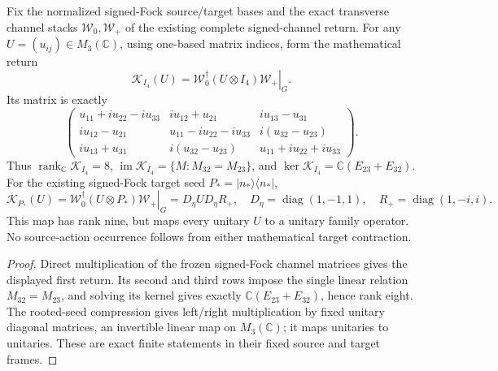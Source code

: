 \documentclass[11pt]{article}
\begin{document}
\begin{proposition}
\label{p1:prop:signed-target-image-rank}
Fix the normalized signed-Fock source/target bases and the exact
transverse channel stacks $\mathcal W_0,\mathcal W_+$ of the existing
complete signed-channel return.  For any $U=(u_{ij})\in M_3(\mathbb C)$, using one-based matrix indices,
form the mathematical return
\[
\mathcal K_{I_4}(U)
 =\left.\mathcal W_0^\dagger(U\otimes I_4)\mathcal W_+\right|_G.
\]
Its matrix is exactly
\[
\begin{pmatrix}
 u_{11}+iu_{22}-iu_{33} & iu_{12}+u_{21} & iu_{13}-u_{31}\\
 iu_{12}-u_{21} & u_{11}-iu_{22}-iu_{33} & i(u_{32}-u_{23})\\
 iu_{13}+u_{31} & i(u_{32}-u_{23}) & u_{11}+iu_{22}+iu_{33}
\end{pmatrix}.
\]
Thus $\operatorname{rank}_{\mathbb C}\mathcal K_{I_4}=8$,
$\operatorname{im}\mathcal K_{I_4}=\{M:M_{32}=M_{23}\}$,
and $\ker\mathcal K_{I_4}=\mathbb C(E_{23}+E_{32})$.
For the existing signed-Fock target seed $P_*=|n_*\rangle\langle n_*|$,
\[
\mathcal K_{P_*}(U)
 =\left.\mathcal W_0^\dagger(U\otimes P_*)\mathcal W_+\right|_G
 = D_\eta U D_\eta R_+,
\quad D_\eta=\operatorname{diag}(1,-1,1),\quad
 R_+=\operatorname{diag}(1,-i,i).
\]
This map has rank nine, but maps every unitary $U$ to a unitary
family operator. No source-action occurrence follows from either
mathematical target contraction.
\end{proposition}
\begin{proof}
Direct multiplication of the frozen signed-Fock channel matrices gives
the displayed first return. Its second and third rows impose the single
linear relation $M_{32}=M_{23}$, and solving its kernel gives exactly
$\mathbb C(E_{23}+E_{32})$, hence rank eight. The rooted-seed
compression gives left/right multiplication by fixed unitary diagonal
matrices, an invertible linear map on $M_3(\mathbb C)$; it maps
unitaries to unitaries. These are exact finite statements in their
fixed source and target frames.
\end{proof}
\end{document}
